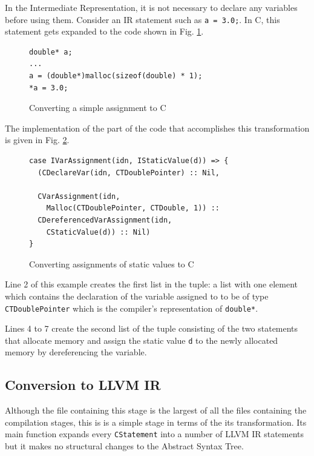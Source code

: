 \documentclass[11pt]{report}
\begin{document}
In the Intermediate Representation, it is not necessary to declare any variables before using them. Consider an IR statement such as \texttt{a = 3.0;}. In C, this statement gets expanded to the code shown in Fig. \ref{iconvc1}.
\begin{figure}[ht]
\begin{lstlisting}
double* a;
...
a = (double*)malloc(sizeof(double) * 1);
*a = 3.0;
\end{lstlisting}
\caption{Converting a simple assignment to C}
\label{iconvc1}
\end{figure}

The implementation of the part of the code that accomplishes this transformation is given in Fig. \ref{iconvc2}.

\begin{figure}[ht]
\begin{lstlisting}
case IVarAssignment(idn, IStaticValue(d)) => {
  (CDeclareVar(idn, CTDoublePointer) :: Nil,
  
  CVarAssignment(idn, 
    Malloc(CTDoublePointer, CTDouble, 1)) ::
  CDereferencedVarAssignment(idn, 
    CStaticValue(d)) :: Nil)
}
\end{lstlisting}
\caption{Converting assignments of static values to C}
\label{iconvc2}
\end{figure}

Line 2 of this example creates the first list in the tuple: a list with one element which contains the declaration of the variable assigned to to be of type \texttt{CTDoublePointer} which is the compiler's representation of \texttt{double*}.

Lines 4 to 7 create the second list of the tuple consisting of the two statements that allocate memory and assign the static value \texttt{d} to the newly allocated memory by dereferencing the variable.



\subsection{Conversion to LLVM IR}

Although the file containing this stage is the largest of all the files containing the compilation stages, this is is a simple stage in terms of the its transformation. Its main function expands every \texttt{CStatement} into a number of LLVM IR statements but it makes no structural changes to the Abstract Syntax Tree.
\end{document}

